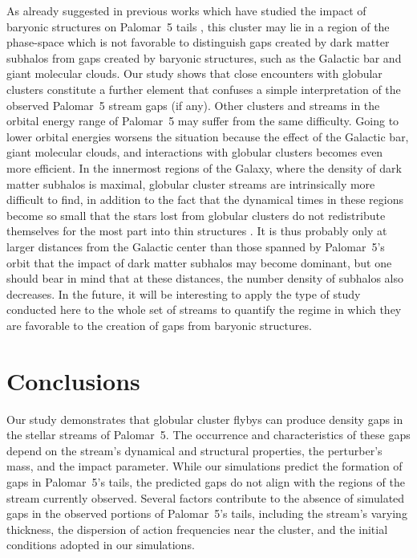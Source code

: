     As already suggested in previous works which have studied the impact of baryonic structures on Palomar~5 tails \citep{2017NatAs...1..633P, 2019MNRAS.484.2009B}, this cluster may lie in a region of the phase-space which is not favorable to distinguish gaps created by dark matter subhalos from gaps created by baryonic structures, such as the Galactic bar and giant molecular clouds. Our study shows that close encounters with globular clusters constitute a further element that confuses a simple interpretation of the observed Palomar~5 stream gaps (if any). Other clusters and streams in the orbital energy range of Palomar~5 may suffer from the same difficulty. Going to lower orbital energies worsens the situation because the effect of the Galactic bar, giant molecular clouds, and interactions with globular clusters becomes even more efficient. In the innermost regions of the Galaxy, where the density of dark matter subhalos is maximal, globular cluster streams are intrinsically more difficult to find, in addition to the fact that the dynamical times in these regions become so small that the stars lost from globular clusters do not redistribute themselves for the most part into thin structures \citep[see][]{2023A&A...673A..44F}. It is thus probably only at larger distances from the Galactic center than those spanned by Palomar~5's orbit that the impact of dark matter subhalos may become dominant, but one should bear in mind that at these distances, the number density of subhalos also decreases. In the future, it will be interesting to apply the type of study conducted here to the whole set of streams to quantify the regime in which they are favorable to the creation of gaps from baryonic structures.
  

\section{Conclusions}

    Our study demonstrates that globular cluster flybys can produce density gaps in the stellar streams of Palomar~5. The occurrence and characteristics of these gaps depend on the stream's dynamical and structural properties, the perturber's mass, and the impact parameter. While our simulations predict the formation of gaps in Palomar~5's tails, the predicted gaps do not align with the regions of the stream currently observed. Several factors contribute to the absence of simulated gaps in the observed portions of Palomar~5's tails, including the stream's varying thickness, the dispersion of action frequencies near the cluster, and the initial conditions adopted in our simulations. 

